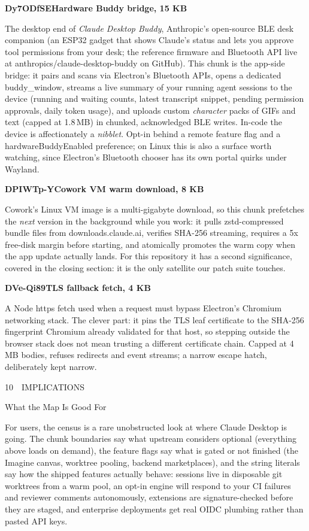 \documentclass[11pt]{article}
\newcommand{\mono}{\ttfamily}
\newcommand{\reppar}[1]{{\fontsize{10.5}{15.2}\selectfont #1\par}\vspace{8pt}}
\newcommand{\code}[1]{{\mono\small #1}}
\newcommand{\reportsection}[3]{%
  \vspace{14pt}%
  {\mono\footnotesize\color{baseMid}\addfontfeatures{LetterSpace=8.0}\MakeUppercase{#1\, \textbullet\, #2}}\par
  \vspace{3pt}%
  {\heavy\fontsize{17}{19}\selectfont\color{base900} #3\par}
  \vspace{4pt}{\color{accent}\hrule height 1.6pt}\vspace{9pt}%
}
\newcommand{\chunkhead}[2]{%
  \vspace{4pt}%
  {\fontsize{10.5}{15.2}\selectfont
   {\mono\bfseries\color{accentink}#1}\;\textbullet\;\textbf{#2}\par}
  \vspace{2pt}}
\begin{document}
\chunkhead{Dy7ODfSE}{Hardware Buddy bridge, 15 KB}
\reppar{The desktop end of \textit{Claude Desktop Buddy}, Anthropic's open-source BLE desk companion (an ESP32 gadget that shows Claude's status and lets you approve tool permissions from your desk; the reference firmware and Bluetooth API live at \code{anthropics/claude-desktop-buddy} on GitHub). This chunk is the app-side bridge: it pairs and scans via Electron's Bluetooth APIs, opens a dedicated \code{buddy\_window}, streams a live summary of your running agent sessions to the device (running and waiting counts, latest transcript snippet, pending permission approvals, daily token usage), and uploads custom \textit{character} packs of GIFs and text (capped at 1.8\,MB) in chunked, acknowledged BLE writes. In-code the device is affectionately a \textit{nibblet}. Opt-in behind a remote feature flag and a \code{hardwareBuddyEnabled} preference; on Linux this is also a surface worth watching, since Electron's Bluetooth chooser has its own portal quirks under Wayland.}

\chunkhead{DPIWTp-Y}{Cowork VM warm download, 8 KB}
\reppar{Cowork's Linux VM image is a multi-gigabyte download, so this chunk prefetches the \textit{next} version in the background while you work: it pulls zstd-compressed bundle files from \code{downloads.claude.ai}, verifies SHA-256 streaming, requires a 5x free-disk margin before starting, and atomically promotes the warm copy when the app update actually lands. For this repository it has a second significance, covered in the closing section: it is the only satellite our patch suite touches.}

\chunkhead{DVe-Qi89}{TLS fallback fetch, 4 KB}
\reppar{A Node \code{https} fetch used when a request must bypass Electron's Chromium networking stack. The clever part: it pins the TLS leaf certificate to the SHA-256 fingerprint Chromium already validated for that host, so stepping outside the browser stack does not mean trusting a different certificate chain. Capped at 4\,MB bodies, refuses redirects and event streams; a narrow escape hatch, deliberately kept narrow.}

\reportsection{10}{Implications}{What the Map Is Good For}

\reppar{For users, the census is a rare unobstructed look at where Claude Desktop is going. The chunk boundaries say what upstream considers optional (everything above loads on demand), the feature flags say what is gated or not finished (the Imagine canvas, worktree pooling, backend marketplaces), and the string literals say how the shipped features actually behave: sessions live in disposable git worktrees from a warm pool, an opt-in engine will respond to your CI failures and reviewer comments autonomously, extensions are signature-checked before they are staged, and enterprise deployments get real OIDC plumbing rather than pasted API keys.}
\end{document}
